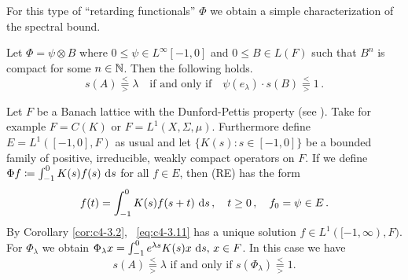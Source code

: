 For this type of \enquote{retarding functionals} $\Phi$ we obtain a simple characterization of the spectral bound.
\begin{corollary*}\label{cor:c4-3.9-kgk}
%
%
Let $\Phi = \psi \otimes B$ where $0 \leq \psi \in L^{\infty}[-1,0]$ and $0 \leq B \in L(F)$ such that $B^{n}$ is compact for some $n \in \mathbb{N}$.
Then the following holds.
\begin{equation}\label{eq:c4-3.10}
s(A) \overset{<}{ \underset{>}{=} } \lambda \quad 
\text{if and only if} 
\quad 
\psi(e_{\lambda}) \cdot s(B) 
\overset{<}{ \underset{>}{=} } 1 \,.
\end{equation}
\end{corollary*}
\begin{example}\label{ex:c4-3.10}
%
%
%
Let $F$ be a Banach lattice with the Dunford-Pettis property (see \citet[Section II.9]{schaefer:1974}).
Take for example $F = C(K)$ or $F = L^{1}(X, \Sigma, \mu)$.
Furthermore define $E = L^{1}([-1,0],F)$ as usual and let $\{K(s) \colon s \in [-1,0]\}$ be a bounded family of positive, irreducible, weakly compact operators on $F$.
If we define $\Phi f \coloneqq \int_{-1}^{0} K(s)f(s) \, \mathop{}\!\mathrm{d}{s}$ for all $f \in E$, then (RE) has the form
\begin{equation}\label{eq:c4-3.11}
f(t) = \int_{-1}^{0} K(s)f(s+t) \, \mathop{}\!\mathrm{d}{s} \,, \quad t \geq 0 \,,\quad f_{0} = \psi \in E\,.
\end{equation}
By Corollary \ref{cor:c4-3.2}, \ \eqref{eq:c4-3.11} has a unique solution $f \in L^{1}([-1,\infty),F)$.
For $\Phi_{\lambda}$ we obtain $\Phi_{\lambda}x = \int_{-1}^{0} e^{\lambda s}K(s)x \, \mathop{}\!\mathrm{d}{s},\, x \in F$.
In this case we have 
\[
\text{$s(A) \overset{<}{ \underset{>}{=} } \lambda$  if and only if 
$s(\Phi_{\lambda}) \overset{<}{ \underset{>}{=} } 1$.}
\]
\end{example}

